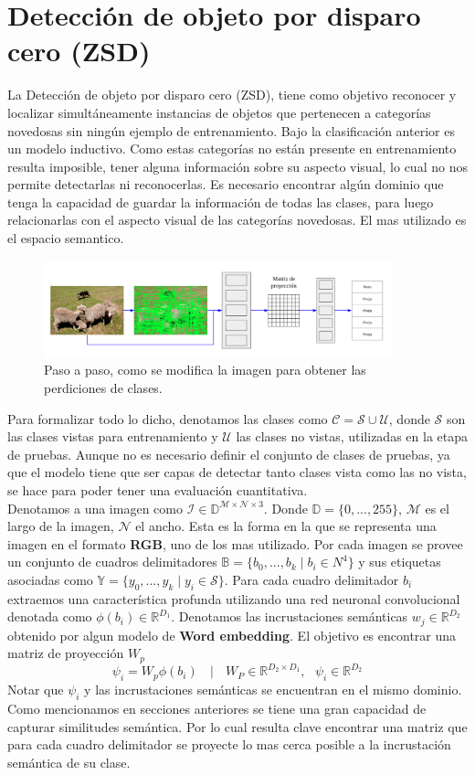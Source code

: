 \section {Detección de objeto por disparo cero (ZSD)}
La Detección de objeto por disparo cero (ZSD), tiene como objetivo reconocer y localizar simultáneamente instancias de objetos que pertenecen a categorías novedosas sin ningún ejemplo de entrenamiento. Bajo la clasificación anterior es un modelo inductivo. Como estas categorías no están presente en entrenamiento resulta imposible, tener alguna información sobre su aspecto visual, lo cual no nos permite detectarlas ni reconocerlas. Es necesario encontrar algún dominio que tenga la capacidad de guardar la información de todas las clases, para luego relacionarlas con el aspecto visual de las categorías novedosas. El mas utilizado es el espacio semantico.
\begin{figure}
	\centering
	\includegraphics[width=0.9\textwidth]{img/diseno_alto_nievel.png}
	\caption{Paso a paso, como se modifica la imagen para obtener las perdiciones de clases.}
	\label{fig:arqutectura}
\end{figure}
Para formalizar todo lo dicho, denotamos las clases como $\mathcal{C} = \mathcal{S} \cup \mathcal{U}$, donde $\mathcal{S}$ son las clases vistas para entrenamiento y $\mathcal{U}$ las clases no vistas, utilizadas en la etapa de pruebas. Aunque no es necesario definir el conjunto de clases de pruebas, ya que el modelo tiene que ser capas de detectar tanto clases vista como las no vista, se hace para poder tener una evaluación cuantitativa.\\
Denotamos a una imagen como $\mathcal{I} \in \mathbb{D}^{\mathcal{M} \times \mathcal{N} \times 3}$. Donde $\mathbb{D} = \{0,...,255\}$, $\mathcal{M}$  es el largo de la imagen, $\mathcal{N}$ el ancho. Esta es la forma en la que se representa una imagen en el formato \textbf{RGB}, uno de los mas utilizado. Por cada imagen se provee un conjunto de cuadros delimitadores  $\mathbb{B} = \{b_0,...,b_k\mid b_i \in N^4\}$ y sus etiquetas asociadas como $\mathbb{Y} = \{y_0,...,y_k\mid y_i \in \mathcal{S}\}$. Para cada cuadro delimitador $b_i$ extraemos una característica profunda utilizando una red neuronal convolucional denotada como $\phi(b_i) \in \mathbb{R}^{D_1}$. Denotamos las incrustaciones semánticas $w_j \in  \mathbb{R}^{D_2}$ obtenido por algun modelo de \textbf{Word embedding}. El objetivo es encontrar una matriz de proyección $W_p$ \[ \psi_i = W_p\phi(b_i) \:\:\:\mid\:\:\: W_P \in \mathbb{R}^{D_2 \times D_1},\:\:\: \psi_i \in \mathbb{R}^{D_2} \] Notar que $\psi_i$ y las incrustaciones semánticas se encuentran en el mismo dominio. Como mencionamos en secciones anteriores se tiene una gran capacidad de capturar similitudes semántica. Por lo cual resulta clave encontrar una matriz que para cada cuadro delimitador se proyecte lo mas cerca posible a la incrustación semántica de su clase.






